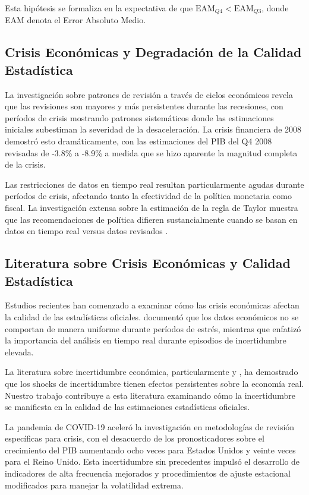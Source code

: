 \documentclass[12pt,a4paper]{article}
\begin{document}
Esta hipótesis se formaliza en la expectativa de que $\text{EAM}_{Q4} < \text{EAM}_{Q3}$, donde EAM denota el Error Absoluto Medio.

\subsection{Crisis Económicas y Degradación de la Calidad Estadística}

La investigación sobre patrones de revisión a través de ciclos económicos revela que las revisiones son mayores y más persistentes durante las recesiones, con períodos de crisis mostrando patrones sistemáticos donde las estimaciones iniciales subestiman la severidad de la desaceleración. La crisis financiera de 2008 demostró esto dramáticamente, con las estimaciones del PIB del Q4 2008 revisadas de -3.8\% a -8.9\% a medida que se hizo aparente la magnitud completa de la crisis.

Las restricciones de datos en tiempo real resultan particularmente agudas durante períodos de crisis, afectando tanto la efectividad de la política monetaria como fiscal. La investigación extensa sobre la estimación de la regla de Taylor muestra que las recomendaciones de política difieren sustancialmente cuando se basan en datos en tiempo real versus datos revisados \citep{orphanides2001}.

\subsection{Literatura sobre Crisis Económicas y Calidad Estadística}

Estudios recientes han comenzado a examinar cómo las crisis económicas afectan la calidad de las estadísticas oficiales. \citet{aruoba2008} documentó que los datos económicos no se comportan de manera uniforme durante períodos de estrés, mientras que \citet{croushore2011} enfatizó la importancia del análisis en tiempo real durante episodios de incertidumbre elevada.

La literatura sobre incertidumbre económica, particularmente \citet{bloom2009} y \citet{baker2016}, ha demostrado que los shocks de incertidumbre tienen efectos persistentes sobre la economía real. Nuestro trabajo contribuye a esta literatura examinando cómo la incertidumbre se manifiesta en la calidad de las estimaciones estadísticas oficiales.

La pandemia de COVID-19 aceleró la investigación en metodologías de revisión específicas para crisis, con el desacuerdo de los pronosticadores sobre el crecimiento del PIB aumentando ocho veces para Estados Unidos y veinte veces para el Reino Unido. Esta incertidumbre sin precedentes impulsó el desarrollo de indicadores de alta frecuencia mejorados y procedimientos de ajuste estacional modificados para manejar la volatilidad extrema.
\end{document}
